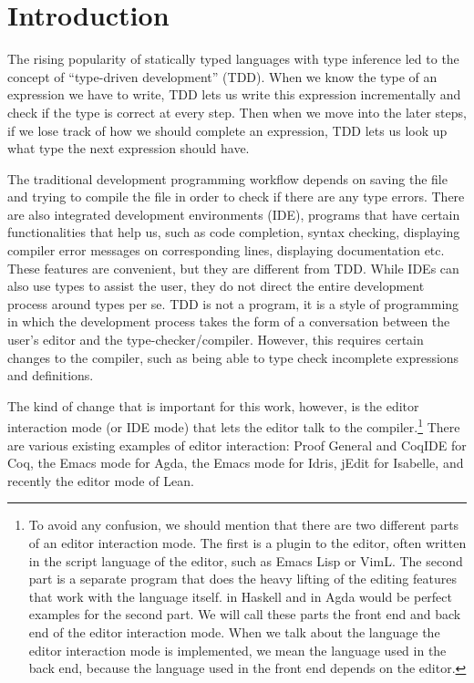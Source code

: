 \section{Introduction} \label{sec:introduction}

The rising popularity of statically typed languages with type inference led to
the concept of ``type-driven development'' (TDD).
When we know the type of an expression we have to write, TDD lets us write this
expression incrementally and check if the type is correct at every step.  Then
when we move into the later steps, if we lose track of how we should complete
an expression, TDD lets us look up what type the next expression should have.

The traditional development programming workflow depends on saving the
file and trying to compile the file in order to check if there are any type
errors. There are also integrated development environments (IDE), programs that have
certain functionalities that help us, such as code completion, syntax checking,
displaying compiler error messages on corresponding lines, displaying
documentation etc.  These features are convenient, but they are different from
TDD. While IDEs can also use types to assist the user, they do not direct the
entire development process around types per se. TDD is not a program, it is a
style of programming in which the development process takes the form of a
conversation between the user's editor and the type-checker/compiler. However,
this requires certain changes to the compiler, such as being able to type check
incomplete expressions and definitions.\cite{tdd}

The kind of change that is important for this work, however, is the editor
interaction mode (or IDE mode) that lets the editor
talk to the compiler.\footnote{To avoid any confusion, we should mention that
  there are two different parts of an editor interaction mode. The first is a
  plugin to the editor, often written in the script language of the editor,
  such as Emacs Lisp or VimL. The second part is a separate program that does
  the heavy lifting of the editing features that work with the language
  itself.   in Haskell and  in Agda would be
  perfect examples for the second part. We will call these parts the front
  end and back end of the editor interaction mode. When we talk about the
  language the editor interaction mode is implemented, we mean the language
  used in the back end, because the language used in the front end
  depends on the editor.}
There are various existing examples of editor interaction:
Proof General\cite{pg} and CoqIDE for Coq\cite{coq},
the Emacs mode\cite{agdamode} for Agda\cite{agda},
the Emacs mode\cite{idrismode} for Idris\cite{idris},
jEdit\cite{isabellejedit} for Isabelle\cite{isabelle},
and recently the editor mode of Lean\cite{lean}.


